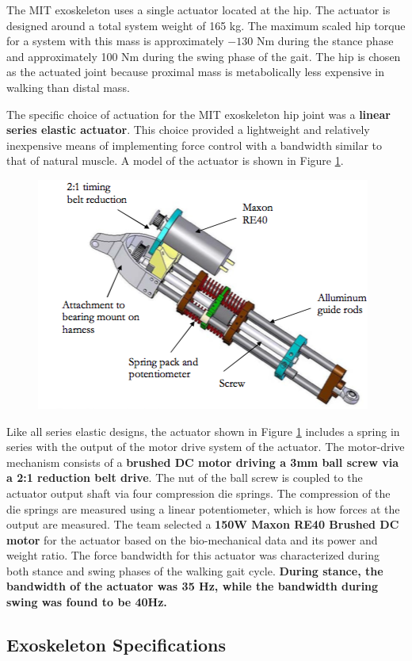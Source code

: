 The MIT exoskeleton uses a single actuator located at the hip.  The actuator is designed around a total system weight of 165 kg.  The maximum scaled hip torque for a system with this mass is approximately $-130$ Nm during the stance phase and approximately 100 Nm during the swing phase of the gait.  The hip is chosen as the actuated joint because proximal mass is metabolically less expensive in walking than distal mass.

The specific choice of actuation for the MIT exoskeleton hip joint was a {\bf linear series elastic actuator}.  This choice provided a lightweight and relatively inexpensive means of implementing force control with a bandwidth similar to that of natural muscle.  A model of the actuator is shown in Figure \ref{fig:mitSEA}.
\begin{figure}[thpb]
\centering
\includegraphics[width=3.in]{exos/figs/MIT/mitSEA}
  \caption{}
  \vspace{-0.2in}
 \label{fig:mitSEA}   
 \end{figure} 
Like all series elastic designs, the actuator shown in Figure \ref{fig:mitSEA} includes a spring in series with the output of the motor drive system of the actuator.  The motor-drive mechanism consists of a {\bf brushed DC motor driving a 3mm ball screw via a 2:1 reduction belt drive}.  The nut of the ball screw is coupled to the actuator output shaft via four compression die springs.  The compression of the die springs are measured using a linear potentiometer, which is how forces at the output are measured.
The team selected a {\bf 150W Maxon RE40 Brushed DC motor} for the actuator  based on the bio-mechanical data and its power and weight ratio. The force bandwidth for this actuator was characterized during both stance and swing phases of the walking gait cycle.  {\bf During stance, the bandwidth of the actuator was 35 Hz, while the bandwidth during swing was found to be 40Hz.} 
 
 \subsection{Exoskeleton Specifications}
 
